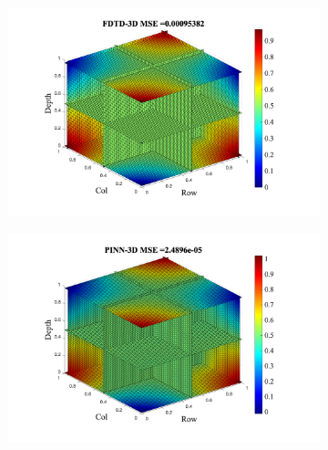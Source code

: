 \begin{frame}
  \begin{figure}
    \centering
    \begin{subfigure}{0.42\textwidth}
      \centering
      \includegraphics[width=\textwidth]{figure/FIG_FDTD_3D_tol_1E_8.pdf}
    \end{subfigure}
    \begin{subfigure}{0.42\textwidth}
      \centering
      \includegraphics[width=\textwidth]{figure/FIG_PINN_3D_tol_1E_4.pdf}
    \end{subfigure}
  \end{figure}

\end{frame}

